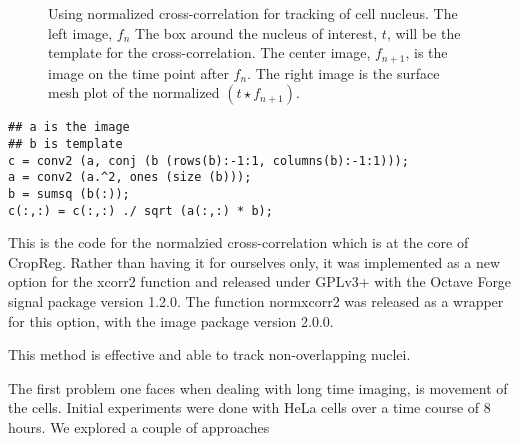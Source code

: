   \begin{figure}
    \centering
    \caption[Using normalized cross-correlation for tracking of cell nucleus.]
            {Using normalized cross-correlation for tracking of cell nucleus. The left image, $f_n$ 
             The box around the nucleus of interest, $t$, will be the template for the cross-correlation.
             The center image, $f_{n+1}$, is the image on the time point after $f_n$. The right image is
             the surface mesh plot of the normalized $(t \star f_{n+1})$.}
    \label{fig:normxcorr2}
  \end{figure}


  \begin{verbatim}
## a is the image
## b is template
c = conv2 (a, conj (b (rows(b):-1:1, columns(b):-1:1))); 
a = conv2 (a.^2, ones (size (b)));
b = sumsq (b(:));
c(:,:) = c(:,:) ./ sqrt (a(:,:) * b); 
  \end{verbatim}
  This is the code for the normalzied cross-correlation which is at the core of CropReg. Rather than having
  it for ourselves only, it was implemented as a new option for the xcorr2 function and released under GPLv3+ with
  the Octave Forge signal package version 1.2.0. The function normxcorr2 was released as a wrapper for
  this option, with the image package version 2.0.0.

  This method is effective and able to track non-overlapping nuclei.


  The first problem one faces when dealing with long time imaging, is movement of the cells.
  Initial experiments were done with HeLa cells over a time course of 8 hours. We explored
  a couple of approaches
  

